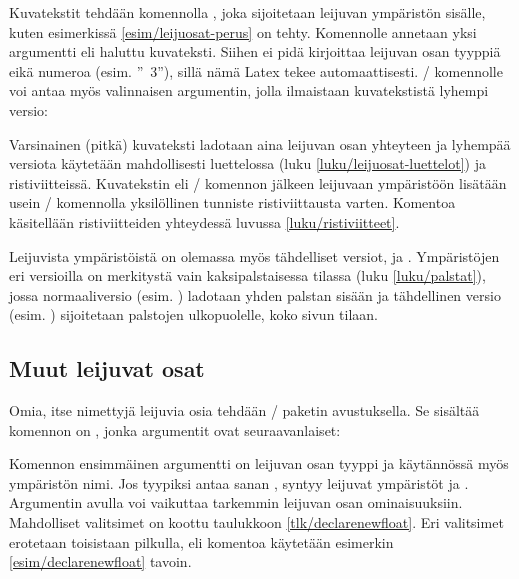 Kuvatekstit tehdään komennolla , joka sijoitetaan
leijuvan ympäristön sisälle, kuten esimerkissä
\ref{esim/leijuosat-perus} on tehty. Komennolle annetaan yksi argumentti
eli haluttu kuvateksti. Siihen ei pidä kirjoittaa leijuvan osan tyyppiä
eikä numeroa (esim. ''\tablename~3''), sillä nämä Latex tekee
automaattisesti. \-/ komennolle voi antaa myös
valinnaisen argumentin, jolla ilmaistaan kuvatekstistä lyhempi versio:

\begin{koodilohkosis}
\caption[Lyhyt kuvateksti.]{Varsinainen pitkä kuvateksti.}
\end{koodilohkosis}

\noindent
Varsinainen (pitkä) kuvateksti ladotaan aina leijuvan osan yhteyteen ja
lyhempää versiota käytetään mahdollisesti luettelossa (luku
\ref{luku/leijuosat-luettelot}) ja ristiviitteissä. Kuvatekstin eli
\-/ komennon jälkeen leijuvaan ympäristöön lisätään
usein \-/ komennolla yksilöllinen tunniste
ristiviittausta varten. Komentoa käsitellään ristiviitteiden yhteydessä
luvussa \ref{luku/ristiviitteet}.

Leijuvista ympäristöistä on olemassa myös tähdelliset versiot,
 ja . Ympäristöjen eri versioilla
on merkitystä vain kaksipalstaisessa tilassa (luku \ref{luku/palstat}),
jossa normaaliversio (esim. ) ladotaan yhden palstan
sisään ja tähdellinen versio (esim. ) sijoitetaan
palstojen ulkopuolelle, koko sivun tilaan.

\subsection{Muut leijuvat osat}
\label{luku/leijuosat-omat}

Omia, itse nimettyjä leijuvia osia tehdään \-/
paketin avustuksella. Se sisältää komennon on
, jonka argumentit ovat seuraavanlaiset:

\begin{koodilohkosis}
\end{koodilohkosis}

\noindent
Komennon ensimmäinen argumentti  on leijuvan osan tyyppi
ja käytännössä myös ympäristön nimi. Jos tyypiksi antaa sanan
, syntyy leijuvat ympäristöt  ja
. Argumentin  avulla voi
vaikuttaa tarkemmin leijuvan osan ominaisuuksiin. Mahdolliset valitsimet
on koottu taulukkoon \ref{tlk/declarenewfloat}. Eri valitsimet erotetaan
toisistaan pilkulla, eli komentoa käytetään esimerkin
\ref{esim/declarenewfloat} tavoin.

